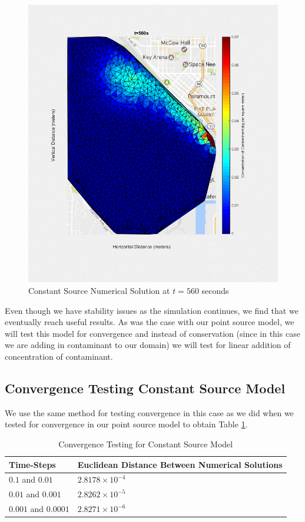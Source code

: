 \documentclass[a4paper]{article}
\theoremstyle{remark}
\theoremstyle{remark}
\begin{document}
\begin{figure}[H]   
\centering   
   \includegraphics[trim=0mm 0mm 0mm 0mm,clip,width=0.5\linewidth]{const7.png}
    \caption{Constant Source Numerical Solution at $t=560$ seconds}
    \label{constant560seconds}
\end{figure}

Even though we have stability issues as the simulation continues, we find that we eventually reach useful results. As was the case with our point source model, we will test this model for convergence and instead of conservation (since in this case we are adding in contaminant to our domain) we will test for linear addition of concentration of contaminant.


\subsection{Convergence Testing Constant Source Model} \label{ConvergenceConstantModelSection}
We use the same method for testing convergence in this case as we did when we tested for convergence in our point source model to obtain Table \ref{convergencemodelconstant}.

\begin{table}[H]
\centering
\caption{Convergence Testing for Constant Source Model}
\label{convergencemodelconstant}
\begin{tabular}{|l|l|}
\hline
Time-Steps           & Euclidean Distance Between Numerical Solutions \\ \hline
$0.1$ and $0.01$     & $2.8178 \times 10^{-4}$              \\ \hline
$0.01$ and $0.001$   & $2.8262 \times 10^{-5}$              \\ \hline
$0.001$ and $0.0001$ & $2.8271 \times 10^{-6}$                                      \\ \hline
\end{tabular}
\end{table}
\end{document}
